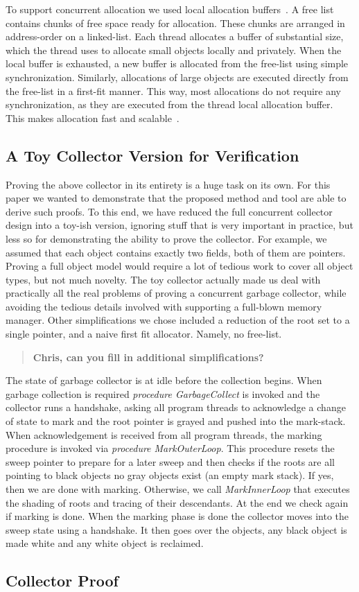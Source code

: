 To support concurrent allocation we used local allocation buffers~\cite{borm02a,bara05}.
A free list contains chunks of free space ready for allocation.
These chunks are arranged in address-order on a linked-list.
Each thread allocates a buffer of substantial size, which the thread uses to allocate small objects locally and privately.
When the local buffer is exhausted, a new buffer is allocated from the free-list using simple synchronization.
Similarly, allocations of large objects are executed directly from the free-list in a first-fit manner.
This way, most allocations do not require any synchronization,
as they are executed from the thread local allocation buffer.
This makes allocation fast and scalable~\cite{borm02a,bara05}. 

\subsection{A Toy Collector Version for Verification}  
Proving the above collector in its entirety is a huge task on its own.
For this paper we wanted to demonstrate that the proposed method and tool are able to derive such proofs.
To this end, we have reduced the full concurrent collector design into a toy-ish version,
ignoring stuff that is very important in practice, but less so for demonstrating the ability to prove the collector.
For example, we assumed that each object contains exactly two fields, both of them are pointers.
Proving a full object model would require a lot of tedious work to cover all object types, but not much novelty.
The toy collector actually made us deal with practically all the real problems of proving a concurrent garbage collector,
while avoiding the tedious details involved with supporting a full-blown memory manager.
Other simplifications we chose included a reduction of the root set to a single pointer,
and a naive first fit allocator.
Namely, no free-list. 

\begin{quote}
{\bf Chris, can you fill in additional simplifications?}
\end{quote}

The state of garbage collector is at {\sc idle} before the collection begins.
When garbage collection is required {\em procedure GarbageCollect} is invoked and the collector runs a handshake,
asking all program threads to acknowledge a change of state to {\sc mark}
and the root pointer is grayed and pushed into the mark-stack.
When acknowledgement is received from all program threads,
the marking procedure is invoked via {\em procedure MarkOuterLoop}.
This procedure resets the sweep pointer to prepare for a later sweep
and then checks if the roots are all pointing to black objects no gray objects exist (an empty mark stack).
If yes, then we are done with marking. Otherwise, we call {\em MarkInnerLoop} that executes the shading of roots and tracing of their descendants.
At the end we check again if marking is done.
When the marking phase is done the collector moves into the {\sc sweep} state using a handshake.
It then goes over the objects, any black object is made white and any white object is reclaimed. 

\subsection{Collector Proof}








